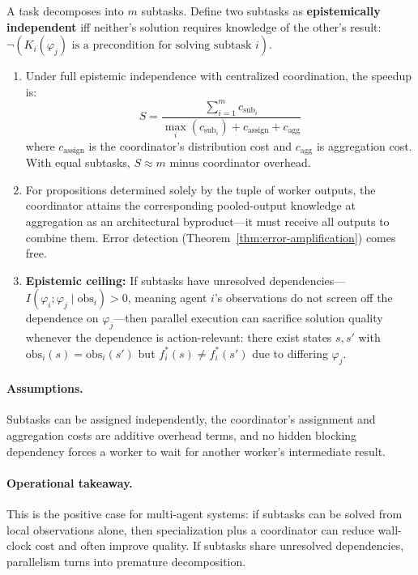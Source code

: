 \begin{theorem}
\label{thm:parallel-acceleration}
A task decomposes into $m$ subtasks. Define two subtasks as \textbf{epistemically independent} iff neither's solution requires knowledge of the other's result: $\neg(K_i(\varphi_j) \text{ is a precondition for solving subtask } i)$.
\begin{enumerate}[leftmargin=*]
\item[(a)] Under full epistemic independence with centralized coordination, the speedup is:
\begin{equation}
S = \frac{\sum_{i=1}^{m} c_{\mathrm{sub}_i}}{\max_i(c_{\mathrm{sub}_i}) + c_{\mathrm{assign}} + c_{\mathrm{agg}}}
\label{eq:parallel-speedup}
\end{equation}
where $c_{\mathrm{assign}}$ is the coordinator's distribution cost and $c_{\mathrm{agg}}$ is aggregation cost. With equal subtasks, $S \approx m$ minus coordinator overhead.
\item[(b)] For propositions determined solely by the tuple of worker outputs, the coordinator attains the corresponding pooled-output knowledge at aggregation as an architectural byproduct---it must receive all outputs to combine them. Error detection (Theorem~\ref{thm:error-amplification}) comes free.
\item[(c)] \textbf{Epistemic ceiling:} If subtasks have unresolved dependencies---$I(\varphi_i; \varphi_j \mid \mathrm{obs}_i) > 0$, meaning agent $i$'s observations do not screen off the dependence on $\varphi_j$---then parallel execution can sacrifice solution quality whenever the dependence is action-relevant: there exist states $s, s'$ with $\mathrm{obs}_i(s) = \mathrm{obs}_i(s')$ but $f_i^*(s) \ne f_i^*(s')$ due to differing $\varphi_j$.
\end{enumerate}
\end{theorem}

\paragraph{Assumptions.}
Subtasks can be assigned independently, the coordinator's assignment and aggregation costs are additive overhead terms, and no hidden blocking dependency forces a worker to wait for another worker's intermediate result.

\paragraph{Operational takeaway.}
This is the positive case for multi-agent systems: if subtasks can be solved from local observations alone, then specialization plus a coordinator can reduce wall-clock cost and often improve quality. If subtasks share unresolved dependencies, parallelism turns into premature decomposition.

